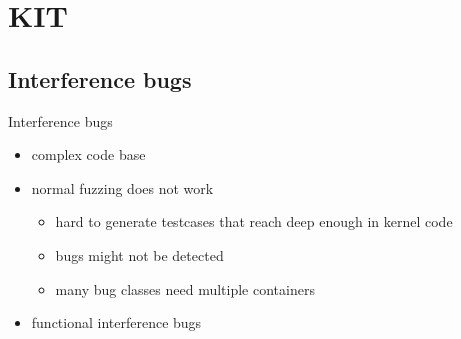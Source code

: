 \section{KIT}
\subsection{Interference bugs}
\begin{frame}{Interference bugs}{~}
\begin{minipage}{0.4 \textwidth}
    \begin{itemize}
    \setlength\itemsep{1em}
    \item complex code base
    \item normal fuzzing does not work 
    \begin{itemize}
    \item hard to generate testcases that reach deep enough in kernel code
    \item bugs might not be detected
    \item many bug classes need multiple containers
    \end{itemize}
    \item functional interference bugs 
\end{itemize}
\end{minipage}
\begin{minipage}{0.45\textwidth}
    

\end{minipage}
\end{frame}


